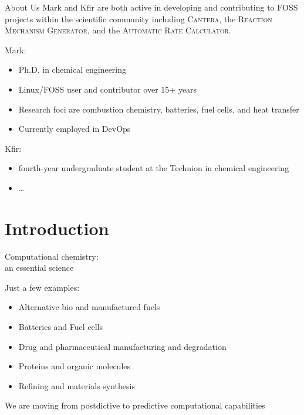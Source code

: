 \begin{frame}{About Us}
Mark and Kfir are both active in developing and contributing to FOSS projects within the scientific community including \textsc{Cantera}, the \textsc{Reaction Mechanism Generator}, and the \textsc{Automatic Rate Calculator}.

\vspace{0.5cm}

Mark:
\begin{itemize}
 \item Ph.D. in chemical engineering
 \item Linux/FOSS user and contributor over 15+ years
 \item Research foci are combustion chemistry, batteries, fuel cells, and heat transfer
 \item Currently employed in DevOps
\end{itemize}

\vspace{0.5cm}

Kfir:
\begin{itemize}
 \item fourth-year undergraduate student at the Technion in chemical engineering
 \item \ldots
\end{itemize}

\end{frame}

\section{Introduction}

\begin{frame}{Computational chemistry:\\ an essential science}

Just a few examples:

\vspace{0.5cm}

 \begin{itemize}
  \item Alternative bio and manufactured fuels
  \item Batteries and Fuel cells
  \item Drug and pharmaceutical manufacturing and degradation
  \item Proteins and organic molecules
  \item Refining and materials synthesis
 \end{itemize}
 
 \vspace{0.5cm}
 
 We are moving from postdictive to predictive computational capabilities
 
\end{frame}

